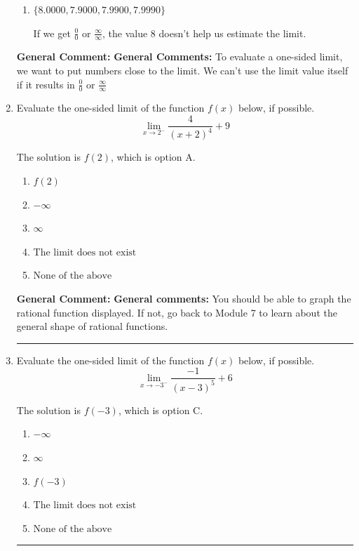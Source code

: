 \documentclass{extbook}[14pt]
\newcommand{\litem}[1]{\item #1

\rule{\textwidth}{0.4pt}}
\begin{document}
\begin{enumerate}
{\begin{enumerate}[label=\Alph*.]
If we get $\frac{0}{0}$ or $\frac{\infty}{\infty}$, the value 8 doesn't help us estimate the limit.
\item \( \{ 8.0000, 7.9000, 7.9900, 7.9990 \} \)

If we get $\frac{0}{0}$ or $\frac{\infty}{\infty}$, the value 8 doesn't help us estimate the limit.
\end{enumerate}

\textbf{General Comment:} \textbf{General Comments:} To evaluate a one-sided limit, we want to put numbers close to the limit. We can't use the limit value itself if it results in $\frac{0}{0}$ or $\frac{\infty}{\infty}$
}
\litem{
Evaluate the one-sided limit of the function $f(x)$ below, if possible.
\[ \lim_{x \rightarrow 2^-} \frac{4}{(x+2)^4}+9 \]

The solution is \( f(2) \), which is option A.\begin{enumerate}[label=\Alph*.]
\item \( f(2) \)


\item \( -\infty \)


\item \( \infty \)


\item \( \text{The limit does not exist} \)


\item \( \text{None of the above} \)


\end{enumerate}

\textbf{General Comment:} \textbf{General comments:} You should be able to graph the rational function displayed. If not, go back to Module 7 to learn about the general shape of rational functions.
}
\litem{
Evaluate the one-sided limit of the function $f(x)$ below, if possible.
\[ \lim_{x \rightarrow -3^-} \frac{-1}{(x-3)^5}+6 \]

The solution is \( f(-3) \), which is option C.\begin{enumerate}[label=\Alph*.]
\item \( -\infty \)


\item \( \infty \)


\item \( f(-3) \)


\item \( \text{The limit does not exist} \)


\item \( \text{None of the above} \)



\end{enumerate}}
\end{enumerate}
\end{document}
